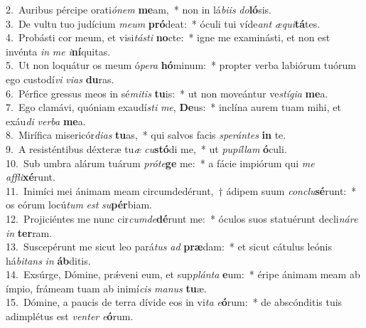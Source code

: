 {2.~}Auribus pércipe orati\textit{ó}\textit{nem} \textbf{me}am,~* non in lá\textit{bi}\textit{is} \textit{do}\textbf{ló}sis.\\
{3.~}De vultu tuo judícium \textit{me}\textit{um} \textbf{pró}deat:~* óculi tui víde\textit{ant} \textit{æ}\textit{qui}\textbf{tá}tes.\\
{4.~}Probásti cor meum, et visi\textit{tá}\textit{sti} \textbf{no}cte:~* igne me examinásti, et non est invénta \textit{in} \textit{me} \textit{i}\textbf{ní}quitas.\\
{5.~}Ut non loquátur os meum ó\textit{pe}\textit{ra} \textbf{hó}minum:~* propter verba labiórum tuórum ego custodí\textit{vi} \textit{vi}\textit{as} \textbf{du}ras.\\
{6.~}Pérfice gressus meos in sé\textit{mi}\textit{tis} \textbf{tu}is:~* ut non moveántur ve\textit{stí}\textit{gi}\textit{a} \textbf{me}a.\\
{7.~}Ego clamávi, quóniam exaudí\textit{sti} \textit{me}, \textbf{De}us:~* inclína aurem tuam mihi, et exáu\textit{di} \textit{ver}\textit{ba} \textbf{me}a.\\
{8.~}Mirífica misericór\textit{di}\textit{as} \textbf{tu}as,~* qui salvos facis \textit{spe}\textit{rán}\textit{tes} \textbf{in} te.\\
{9.~}A resisténtibus déxteræ tu\textit{æ} \textit{cu}\textbf{stó}di me,~* ut \textit{pu}\textit{píl}\textit{lam} \textbf{ó}culi.\\
{10.~}Sub umbra alárum tuárum \textit{pró}\textit{te}\textbf{ge} me:~* a fácie impiórum qui \textit{me} \textit{af}\textit{fli}\textbf{xé}runt.\\
{11.~}Inimíci mei ánimam meam circumdedérunt,~† ádipem suum \textit{con}\textit{clu}\textbf{sé}runt:~* os eórum locú\textit{tum} \textit{est} \textit{su}\textbf{pér}biam.\\
{12.~}Projiciéntes me nunc cir\textit{cum}\textit{de}\textbf{dé}runt me:~* óculos suos statuérunt decli\textit{ná}\textit{re} \textit{in} \textbf{ter}ram.\\
{13.~}Suscepérunt me sicut leo pará\textit{tus} \textit{ad} \textbf{præ}dam:~* et sicut cátulus leónis há\textit{bi}\textit{tans} \textit{in} \textbf{áb}ditis.\\
{14.~}Exsúrge, Dómine, prǽveni eum, et sup\textit{plán}\textit{ta} \textbf{e}um:~* éripe ánimam meam ab ímpio, frámeam tuam ab inimí\textit{cis} \textit{ma}\textit{nus} \textbf{tu}æ.\\
{15.~}Dómine, a paucis de terra dívide eos in vi\textit{ta} \textit{e}\textbf{ó}rum:~* de abscónditis tuis adimplétus est \textit{ven}\textit{ter} \textit{e}\textbf{ó}rum.\\
